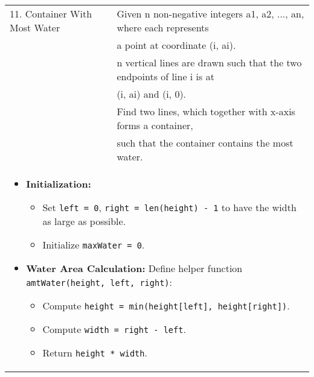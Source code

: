 \begin{summary}
\begin{center}
\begin{tabular}{ll}
            \midrule
            11. Container With Most Water & Given n non-negative integers a1, a2, ..., an, where each represents \\
            & a point at coordinate (i, ai). \\
            & n vertical lines are drawn such that the two endpoints of line i is at \\
            & (i, ai) and (i, 0). \\
            & Find two lines, which together with x-axis forms a container, \\
            & such that the container contains the most water. \\
            \multicolumn{2}{p{\linewidth}}{
                \begin{itemize}
                    \item \textbf{Initialization:}
                    \begin{itemize}
                        \item Set \texttt{left = 0}, \texttt{right = len(height) - 1} to have the width as large as possible.
                        \item Initialize \texttt{maxWater = 0}.
                    \end{itemize}
                
                    \item \textbf{Water Area Calculation:} Define helper function \texttt{amtWater(height, left, right)}:
                    \begin{itemize}
                        \item Compute \texttt{height = min(height[left], height[right])}.
                        \item Compute \texttt{width = right - left}.
                        \item Return \texttt{height * width}.
                    \end{itemize}
                

\end{itemize}}
\end{tabular}
\end{center}
\end{summary}

